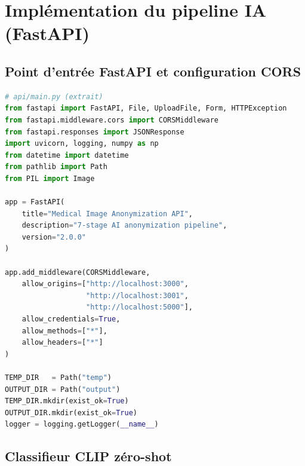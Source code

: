 \section{Implémentation du pipeline IA (FastAPI)}

\subsection{Point d'entrée FastAPI et configuration CORS}

\begin{lstlisting}[language=Python, caption={Configuration FastAPI et CORS (main.py -- extrait)}, label={lst:fastapi_config}]
# api/main.py (extrait)
from fastapi import FastAPI, File, UploadFile, Form, HTTPException
from fastapi.middleware.cors import CORSMiddleware
from fastapi.responses import JSONResponse
import uvicorn, logging, numpy as np
from datetime import datetime
from pathlib import Path
from PIL import Image

app = FastAPI(
    title="Medical Image Anonymization API",
    description="7-stage AI anonymization pipeline",
    version="2.0.0"
)

app.add_middleware(CORSMiddleware,
    allow_origins=["http://localhost:3000",
                   "http://localhost:3001",
                   "http://localhost:5000"],
    allow_credentials=True,
    allow_methods=["*"],
    allow_headers=["*"]
)

TEMP_DIR   = Path("temp")
OUTPUT_DIR = Path("output")
TEMP_DIR.mkdir(exist_ok=True)
OUTPUT_DIR.mkdir(exist_ok=True)
logger = logging.getLogger(__name__)
\end{lstlisting}

\subsection{Classifieur CLIP zéro-shot}

